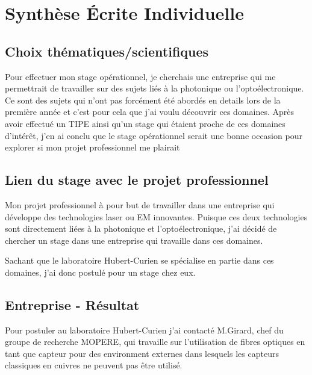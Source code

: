 \documentclass[11pt, openright]{book}
\begin{document}


    \thispagestyle{head}

     \section*{Synthèse Écrite Individuelle}
      \subsection*{Choix thématiques/scientifiques}

      Pour effectuer mon stage opérationnel, je cherchais une entreprise qui me permettrait de travailler sur des sujets liés à la photonique ou l'optoélectronique. Ce sont des sujets qui n'ont pas forcément été abordés en details lors de la première année et c'est pour cela que j'ai voulu découvrir ces domaines. Après avoir effectué un TIPE ainsi qu'un stage qui étaient proche de ces domaines d'intérêt, j'en ai conclu que le stage opérationnel serait une bonne occasion pour explorer si mon projet professionnel me plairait

       \subsection*{Lien du stage avec le projet professionnel}

       Mon projet professionnel à pour but de travailler dans une entreprise qui développe des technologies laser ou EM innovantes. Puisque ces deux technologies sont directement liées à la photonique et l'optoélectronique, j'ai décidé de chercher un stage dans une entreprise qui travaille dans ces domaines.

       Sachant que le laboratoire Hubert-Curien se spécialise en partie dans ces domaines, j'ai donc postulé pour un stage chez eux. 

        \subsection*{Entreprise - Résultat}

        Pour postuler au laboratoire Hubert-Curien j'ai contacté M.Girard, chef du groupe de recherche MOPERE, qui travaille sur l'utilisation de fibres optiques en tant que capteur pour des environment externes dans lesquels les capteurs classiques en cuivres ne peuvent pas être utilisé. 
\end{document}
